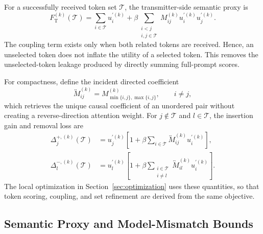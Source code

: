 \documentclass[journal]{IEEEtran}
\begin{document}
For a successfully received token set $\mathcal T$, the transmitter-side semantic proxy is
\begin{equation}
F_{\mathrm T}^{(k)}(\mathcal T)
=\sum_{i\in\mathcal T}u_i^{\prime(k)}
+\beta\!\sum_{\substack{i<j\\i,j\in\mathcal T}}
M_{ij}^{(k)}u_i^{\prime(k)}u_j^{\prime(k)}.
\label{eq:set_utility}
\end{equation}
The coupling term exists only when both related tokens are received. Hence, an unselected token does not inflate the utility of a selected token. This removes the unselected-token leakage produced by directly summing full-prompt scores.

For compactness, define the incident directed coefficient
\begin{equation}
\overleftrightarrow M_{ij}^{(k)}
=M_{\min\{i,j\},\max\{i,j\}}^{(k)},
\qquad i\neq j,
\label{eq:incident_coupling}
\end{equation}
which retrieves the unique causal coefficient of an unordered pair without creating a reverse-direction attention weight. For $j\notin\mathcal T$ and $l\in\mathcal T$, the insertion gain and removal loss are
\begin{align}
\Delta_j^{+,(k)}(\mathcal T)
&=u_j^{\prime(k)}
\left[1+\beta\sum_{i\in\mathcal T}
 \overleftrightarrow M_{ij}^{(k)}u_i^{\prime(k)}\right],
\label{eq:set_add_gain}\\
\Delta_l^{-,(k)}(\mathcal T)
&=u_l^{\prime(k)}
\left[1+\beta\!\sum_{\substack{i\in\mathcal T\\i\neq l}}
 \overleftrightarrow M_{il}^{(k)}u_i^{\prime(k)}\right].
\label{eq:set_remove_loss}
\end{align}
The local optimization in Section~\ref{sec:optimization} uses these quantities, so that token scoring, coupling, and set refinement are derived from the same objective.

\subsection{Semantic Proxy and Model-Mismatch Bounds}
\end{document}
